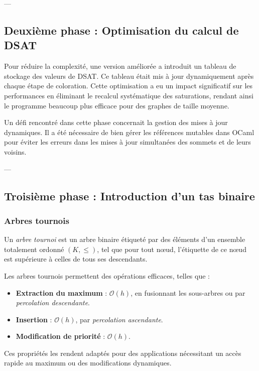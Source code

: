\documentclass[11pt]{article}
\begin{document}
---

\subsection{Deuxième phase : Optimisation du calcul de DSAT}

Pour réduire la complexité, une version améliorée a introduit un tableau de stockage des valeurs de DSAT. Ce tableau était mis à jour dynamiquement après chaque étape de coloration. Cette optimisation a eu un impact significatif sur les performances en éliminant le recalcul systématique des saturations, rendant ainsi le programme beaucoup plus efficace pour des graphes de taille moyenne.

Un défi rencontré dans cette phase concernait la gestion des mises à jour dynamiques. Il a été nécessaire de bien gérer les références mutables dans OCaml pour éviter les erreurs dans les mises à jour simultanées des sommets et de leurs voisins.

---

\subsection{Troisième phase : Introduction d’un tas binaire}
\subsubsection{Arbres tournois} 
Un \textit{arbre tournoi} est un arbre binaire étiqueté par des éléments d’un ensemble totalement ordonné $(K, \leq)$, tel que pour tout nœud, l'étiquette de ce nœud est supérieure à celles de tous ses descendants.\cite{data_structure_complements}

Les arbres tournois permettent des opérations efficaces, telles que :
\begin{itemize}
    \item \textbf{Extraction du maximum} : $\mathcal{O}(h)$, en fusionnant les sous-arbres ou par \textit{percolation descendante}.
    \item \textbf{Insertion} : $\mathcal{O}(h)$, par \textit{percolation ascendante}.
    \item \textbf{Modification de priorité} : $\mathcal{O}(h)$.
\end{itemize}

Ces propriétés les rendent adaptés pour des applications nécessitant un accès rapide au maximum ou des modifications dynamiques.

\vspace{0.5cm}
\end{document}
